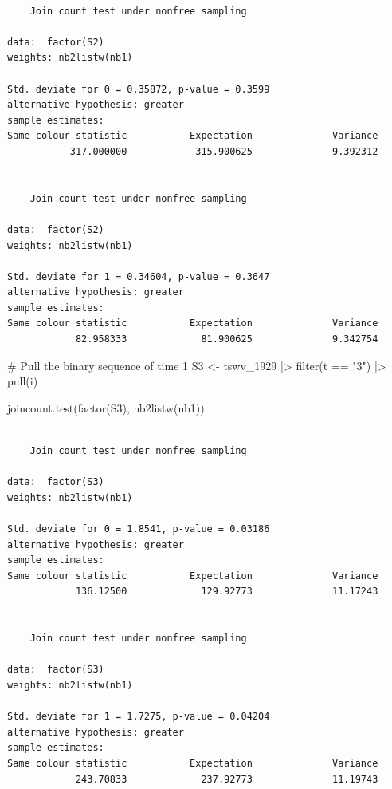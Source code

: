 \documentclass[
  letterpaper,
  DIV=11,
  numbers=noendperiod]{scrreprt}
\newenvironment{Shaded}{\begin{snugshade}}{\end{snugshade}}
\newcommand{\CommentTok}[1]{\textcolor[rgb]{0.37,0.37,0.37}{#1}}
\newcommand{\FunctionTok}[1]{\textcolor[rgb]{0.28,0.35,0.67}{#1}}
\newcommand{\NormalTok}[1]{\textcolor[rgb]{0.00,0.23,0.31}{#1}}
\newcommand{\OtherTok}[1]{\textcolor[rgb]{0.00,0.23,0.31}{#1}}
\newcommand{\SpecialCharTok}[1]{\textcolor[rgb]{0.37,0.37,0.37}{#1}}
\newcommand{\StringTok}[1]{\textcolor[rgb]{0.13,0.47,0.30}{#1}}
\begin{document}
\begin{verbatim}

    Join count test under nonfree sampling

data:  factor(S2) 
weights: nb2listw(nb1) 

Std. deviate for 0 = 0.35872, p-value = 0.3599
alternative hypothesis: greater
sample estimates:
Same colour statistic           Expectation              Variance 
           317.000000            315.900625              9.392312 


    Join count test under nonfree sampling

data:  factor(S2) 
weights: nb2listw(nb1) 

Std. deviate for 1 = 0.34604, p-value = 0.3647
alternative hypothesis: greater
sample estimates:
Same colour statistic           Expectation              Variance 
            82.958333             81.900625              9.342754 
\end{verbatim}

\begin{Shaded}
\begin{Highlighting}[]
\CommentTok{\# Pull the binary sequence of time 1}
\NormalTok{S3 }\OtherTok{\textless{}{-}}\NormalTok{ tswv\_1929 }\SpecialCharTok{|\textgreater{}}
  \FunctionTok{filter}\NormalTok{(t }\SpecialCharTok{==} \StringTok{"3"}\NormalTok{) }\SpecialCharTok{|\textgreater{}}
  \FunctionTok{pull}\NormalTok{(i)}

\FunctionTok{joincount.test}\NormalTok{(}\FunctionTok{factor}\NormalTok{(S3), }
                \FunctionTok{nb2listw}\NormalTok{(nb1))}
\end{Highlighting}
\end{Shaded}

\begin{verbatim}

    Join count test under nonfree sampling

data:  factor(S3) 
weights: nb2listw(nb1) 

Std. deviate for 0 = 1.8541, p-value = 0.03186
alternative hypothesis: greater
sample estimates:
Same colour statistic           Expectation              Variance 
            136.12500             129.92773              11.17243 


    Join count test under nonfree sampling

data:  factor(S3) 
weights: nb2listw(nb1) 

Std. deviate for 1 = 1.7275, p-value = 0.04204
alternative hypothesis: greater
sample estimates:
Same colour statistic           Expectation              Variance 
            243.70833             237.92773              11.19743 
\end{verbatim}
\end{document}
